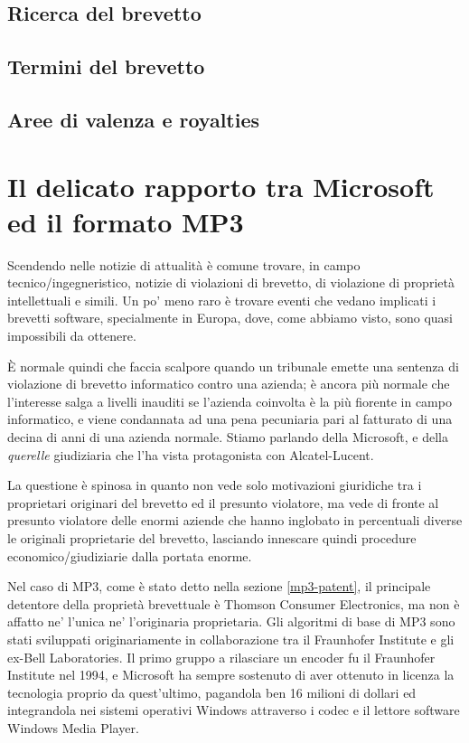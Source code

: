 \subsection{Ricerca del brevetto}

\subsection{Termini del brevetto}

\subsection{Aree di valenza e royalties}

\section{Il delicato rapporto tra Microsoft ed il formato MP3}
Scendendo nelle notizie di attualità è comune trovare, in campo tecnico/ingegneristico, notizie di violazioni di brevetto, di violazione di proprietà intellettuali e simili. Un po' meno raro è trovare eventi che vedano implicati i brevetti software, specialmente in Europa, dove, come abbiamo visto, sono quasi impossibili da ottenere. 

\`E normale quindi che faccia scalpore quando un tribunale emette una sentenza di violazione di brevetto informatico contro una azienda; è ancora più normale che l'interesse salga a livelli inauditi se l'azienda coinvolta è la più fiorente in campo informatico, e viene condannata ad una pena pecuniaria pari al fatturato di una decina di anni di una azienda normale. Stiamo parlando della Microsoft, e della \textit{querelle} giudiziaria che l'ha vista protagonista con Alcatel-Lucent.

La questione è spinosa in quanto non vede solo motivazioni giuridiche tra i proprietari originari del brevetto ed il presunto violatore, ma vede di fronte al presunto violatore delle enormi aziende che hanno inglobato in percentuali diverse le originali proprietarie del brevetto, lasciando innescare quindi procedure economico/giudiziarie dalla portata enorme.

Nel caso di MP3, come è stato detto nella sezione \ref{mp3-patent}, il principale detentore della proprietà brevettuale è Thomson Consumer Electronics, ma non è affatto ne' l'unica ne' l'originaria proprietaria. Gli algoritmi di base di MP3 sono stati sviluppati originariamente in collaborazione tra il Fraunhofer Institute e gli ex-Bell Laboratories. Il primo gruppo a rilasciare un encoder fu il Fraunhofer Institute nel 1994, e Microsoft ha sempre sostenuto di aver ottenuto in licenza la tecnologia proprio da quest'ultimo, pagandola ben 16 milioni di dollari ed integrandola nei sistemi operativi Windows attraverso i codec e il lettore software Windows Media Player.

